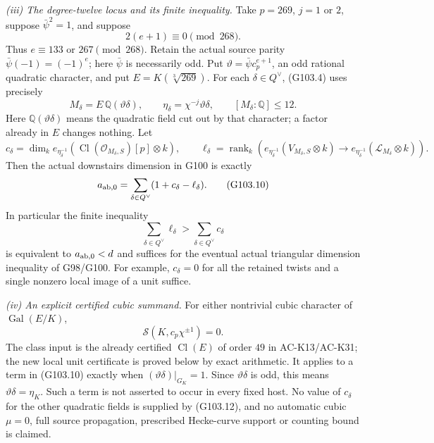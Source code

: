 \begin{theorem}
\emph{(iii) The degree-twelve locus and its finite inequality.}
Take $p=269$, $j=1$ or $2$, suppose $\bar\psi^2=1$, and suppose
\[
              2(e+1)\equiv0\pmod{268}.
 \tag{G103.7}
\]
Thus $e\equiv133$ or $267\pmod{268}$.
Retain the actual source parity
$\bar\psi(-1)=(-1)^e$; here $\bar\psi$ is necessarily odd.
Put $\vartheta=\bar\psi c_p^{e+1}$, an odd rational quadratic
character, and put $E=K(\sqrt[3]{269})$.
For each $\delta\in Q^\vee$, (G103.4) uses precisely
\[
 M_\delta=E\,\mathbb Q(\vartheta\delta),\qquad
 \eta_\delta=\chi^{-j}\vartheta\delta,
 \qquad [M_\delta:\mathbb Q]\le12.
 \tag{G103.8}
\]
Here $\mathbb Q(\vartheta\delta)$ means the quadratic field cut
out by that character; a factor already in $E$ changes nothing.
Let
\[
 c_\delta=\dim_k e_{\eta_\delta^{-1}}
     (\operatorname{Cl}(\mathcal O_{M_\delta,S})[p]\otimes k),
 \qquad
 \ell_\delta=\operatorname{rank}_k\left(
 e_{\eta_\delta^{-1}}(V_{M_\delta,S}\otimes k)
       \longrightarrow e_{\eta_\delta^{-1}}(\mathcal L_{M_\delta}\otimes k)
                         \right).
 \tag{G103.9}
\]
Then the actual downstairs dimension in G100 is exactly
\[
 a_{{\rm ab},0}
       =\sum_{\delta\in Q^\vee}(1+c_\delta-\ell_\delta).
 \tag{G103.10}
\]
In particular the finite inequality
\[
                \sum_{\delta\in Q^\vee}\ell_\delta
                     >\sum_{\delta\in Q^\vee}c_\delta
 \tag{G103.11}
\]
is equivalent to $a_{{\rm ab},0}<d$ and suffices for the eventual
actual triangular dimension inequality of G98/G100.
For example, $c_\delta=0$ for all the retained twists and a
single nonzero local image of a unit suffice.

\emph{(iv) An explicit certified cubic summand.}
For either nontrivial cubic character of $\operatorname{Gal}(E/K)$,
\[
                       \mathcal S(K,c_p\chi^{\pm1})=0.
 \tag{G103.12}
\]
The class input is the already certified $\operatorname{Cl}(E)$
of order $49$ in AC-K13/AC-K31; the new local unit certificate is
proved below by exact arithmetic.
It applies to a term in (G103.10) exactly when
$(\vartheta\delta)|_{G_K}=1$.
Since $\vartheta\delta$ is odd, this means
$\vartheta\delta=\eta_K$.
Such a term is not asserted to occur in every fixed host.
No value of $c_\delta$ for the other quadratic fields is supplied
by (G103.12), and no automatic cubic $\mu=0$, full source
propagation, prescribed Hecke-curve support or counting bound is claimed.


\end{theorem}
